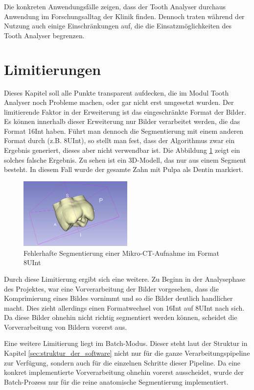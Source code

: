Die konkreten Anwendungsfälle zeigen, dass der Tooth Analyser durchaus Anwendung
im Forschungsalltag der Klinik finden. Dennoch traten während der Nutzung auch
einige Einschränkungen auf, die die Einsatzmöglichkeiten des Tooth Analyser begrenzen.

\section{Limitierungen}
\label{sec:limitierungen} Dieses Kapitel soll alle Punkte transparent aufdecken,
die im Modul Tooth Analyser noch Probleme machen, oder gar nicht erst umgesetzt wurden.
Der limitierende Faktor in der Erweiterung ist das eingeschränkte Format der
Bilder. Es können innerhalb dieser Erweiterung nur Bilder verarbeitet werden,
die das Format \ac{16Int} haben. Führt man dennoch die Segmentierung mit einem
anderen Format durch (z.B. \ac{8UInt}), so stellt man fest, dass der Algorithmus
zwar ein Ergebnis generiert, dieses aber nicht verwendbar ist. Die Abbildung
\ref{fig:3d_error} zeigt ein solches falsche Ergebnis. Zu sehen ist ein \ac{3D}-Modell,
das nur aus einem Segment besteht. In diesem Fall wurde der gesamte Zahn mit
Pulpa als Dentin markiert.

\begin{figure}[h]
	\centering
	\includegraphics[width=0.5\textwidth]{img/3d_view_error.png}
	\caption{Fehlerhafte Segmentierung einer Mikro-CT-Aufnahme im Format 8UInt}
	\label{fig:3d_error}
\end{figure}

Durch diese Limitierung ergibt sich eine weitere. Zu Beginn in der Analysephase
des Projektes, war eine Vorverarbeitung der Bilder vorgesehen, dass die
Komprimierung eines Bildes vornimmt und so die Bilder deutlich handlicher macht.
Dies zieht allerdings einen Formatwechsel von \ac{16Int} auf \ac{8UInt} nach sich.
Da diese Bilder ohnehin nicht richtig segmentiert werden können, scheidet die Vorverarbeitung
von Bildern vorerst aus.

Eine weitere Limitierung liegt im Batch-Modus. Dieser steht laut der Struktur in
Kapitel \ref{sec:struktur_der_software} nicht nur für die ganze
Verarbeitungspipeline zur Verfügung, sondern auch für die einzelnen Schritte dieser
Pipeline. Da eine konkret implementierte Vorverarbeitung ohnehin vorerst
ausscheidet, wurde der Batch-Prozess nur für die reine anatomische Segmentierung
implementiert.

